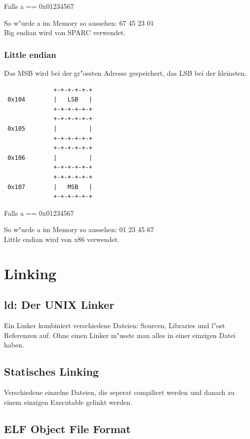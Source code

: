 \documentclass[german, 10pt, a4paper, twocolumn]{scrartcl}
\begin{document}
Falls a == 0x01234567

So w"urde a im Memory so aussehen: 67 45 23 01\\

Big endian wird von SPARC verwendet.

\subsubsection{Little endian}

Das MSB wird bei der gr"ossten Adresse gespeichert, das LSB bei der kleinsten.

\small
\begin{verbatim}
              +-+-+-+-+-+
 0x104        |   LSB   |
              +-+-+-+-+-+
              +-+-+-+-+-+
 0x105        |         |
              +-+-+-+-+-+
              +-+-+-+-+-+
 0x106        |         |
              +-+-+-+-+-+
              +-+-+-+-+-+
 0x107        |   MSB   |
              +-+-+-+-+-+
\end{verbatim}
\normalsize

Falls a == 0x01234567

So w"urde a im Memory so aussehen: 01 23 45 67\\

Little endian wird von x86 verwendet.

\section{Linking}

\subsection{ld: Der UNIX Linker}

Ein Linker kombiniert verschiedene Dateien: Sourcen, Libraries und l"ost Referenzen auf. Ohne einen Linker m"usste man alles in einer einzigen Datei haben.

\subsection{Statisches Linking}

Verschiedene einzelne Dateien, die seperat compiliert werden und danach zu einem einzigen Executable gelinkt werden.

\subsection{ELF Object File Format}
\end{document}
